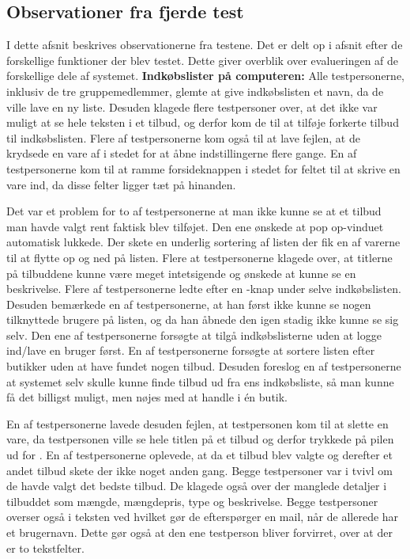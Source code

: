 \subsection{Observationer fra fjerde test}
I dette afsnit beskrives observationerne fra testene. Det er delt op i afsnit efter de forskellige funktioner der blev testet. Dette giver overblik over evalueringen af de forskellige dele af systemet.\newline
\newline
\textbf{Indkøbslister på computeren:}\newline
Alle testpersonerne, inklusiv de tre gruppemedlemmer, glemte at give indkøbslisten et navn, da de ville lave en ny liste. Desuden klagede flere testpersoner over, at det ikke var muligt at se hele teksten i et tilbud, og derfor kom de til at tilføje forkerte tilbud til indkøbslisten. Flere af testpersonerne kom også til at lave fejlen, at de krydsede en vare af i stedet for at åbne indstillingerne flere gange. En af testpersonerne kom til at ramme forsideknappen i stedet for feltet til at skrive en vare ind, da disse felter ligger tæt på hinanden.

Det var et problem for to af testpersonerne at man ikke kunne se at et tilbud man havde valgt rent faktisk blev tilføjet. Den ene ønskede at pop op-vinduet automatisk lukkede. Der skete en underlig sortering af listen der fik en af varerne til at flytte op og ned på listen. Flere at testpersonerne klagede over, at titlerne på tilbuddene kunne være meget intetsigende og ønskede at kunne se en beskrivelse. Flere af testpersonerne ledte efter en -knap under selve indkøbslisten. Desuden bemærkede en af testpersonerne, at han først ikke kunne se nogen tilknyttede brugere på listen, og da han åbnede den igen stadig ikke kunne se sig selv. Den ene af testpersonerne forsøgte at tilgå indkøbslisterne uden at logge ind/lave en bruger først. En af testpersonerne forsøgte at sortere listen efter butikker uden at have fundet nogen tilbud. Desuden foreslog en af testpersonerne at systemet selv skulle kunne finde tilbud ud fra ens indkøbsliste, så man kunne få det billigst muligt, men nøjes med at handle i én butik.

En af testpersonerne lavede desuden fejlen, at testpersonen kom til at slette en vare, da testpersonen ville se hele titlen på et tilbud og derfor trykkede på pilen ud for . En af testpersonerne oplevede, at da et tilbud blev valgte og derefter et andet tilbud skete der ikke noget anden gang. Begge testpersoner var i tvivl om de havde valgt det bedste tilbud. De klagede også over der manglede detaljer i tilbuddet som mængde, mængdepris, type og beskrivelse. Begge testpersoner overser også  i teksten ved  hvilket gør de efterspørger en mail, når de allerede har et brugernavn. Dette gør også at den ene testperson bliver forvirret, over at der er to tekstfelter.

